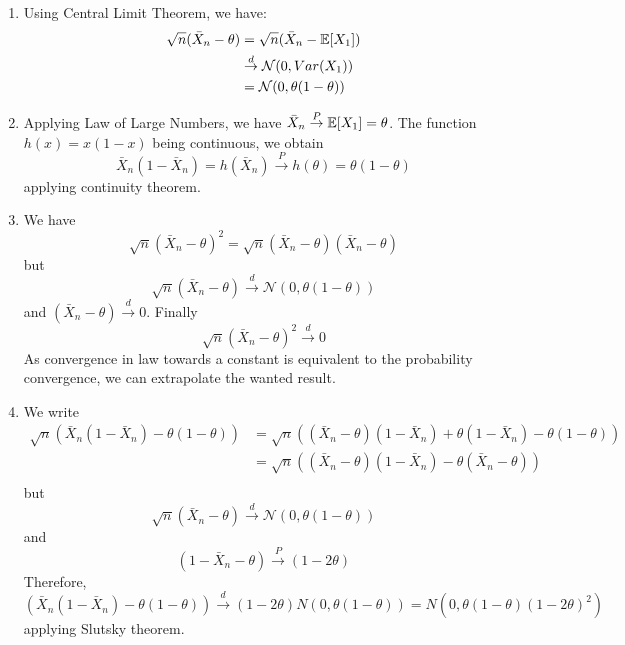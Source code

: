\begin{solution}
  \begin{enumerate}
    \item Using Central Limit Theorem, we have:
          \begin{align*}
            \sqrt{n} ( \bar{X}_n - \theta) & = \sqrt{n} ( \bar{X}_n -
            \mathbb{E}[X_1])                                                                 \\
                                           & \overset{d}{\rightarrow} \mathcal N(0,Var(X_1)) \\
                                           & = \mathcal N(0,\theta(1-\theta))
          \end{align*}
    \item Applying Law of Large Numbers, we have $\bar{X}_n \overset{P}{\rightarrow}\mathbb{E}[X_1]=\theta$.
          The function $h(x)=x(1-x)$ being continuous, we obtain
          \[
            \bar{X}_n (1-\bar{X}_n) = h(\bar{X}_n) \overset{P}{\rightarrow} h(\theta) = \theta(1-\theta)
          \]
          applying continuity theorem.
    \item We have
          \[
            \sqrt{n} {( \bar{X}_n - \theta)}^2 = \sqrt{n} ( \bar{X}_n - \theta)( \bar{X}_n - \theta)
          \]
          but
          \[
            \sqrt{n} ( \bar{X}_n - \theta) \overset{d}{\rightarrow} \mathcal N (0,\theta(1-\theta))
          \]
          and $( \bar{X}_n - \theta) \overset{d}{\rightarrow} 0$. Finally
          \[
            \sqrt{n} {( \bar{X}_n - \theta)}^2 \overset{d}{\rightarrow} 0
          \]
          As convergence in law towards a constant is equivalent to the probability convergence, we can extrapolate the wanted result.
    \item We write
          \begin{align*}
            \sqrt{n} \left( \bar{X}_n (1 - \bar{X}_n) - \theta(1-\theta) \right)
             & = \sqrt{n} \left( (\bar{X}_n-\theta) (1 - \bar{X}_n)+\theta(1 - \bar{X}_n) - \theta(1-\theta) \right) \\
             & = \sqrt{n} \left( (\bar{X}_n-\theta) (1 - \bar{X}_n)-\theta( \bar{X}_n -\theta) \right)               \\
          \end{align*}
          but
          \[
            \sqrt{n} (\bar{X}_n-\theta) \overset{d}{\rightarrow} \mathcal N (0,\theta(1-\theta))
          \]
          and
          \[
            (1 - \bar{X}_n-\theta) \overset{P}{\rightarrow} (1-2\theta)
          \]
          Therefore,
          \[
            \left( \bar{X}_n (1 - \bar{X}_n) - \theta(1-\theta) \right) \overset{d}{\rightarrow} (1-2\theta) N (0,\theta(1-\theta)) = N (0, \theta(1-\theta){(1-2\theta)}^2)
          \]
          applying Slutsky theorem.
  \end{enumerate}
\end{solution}

